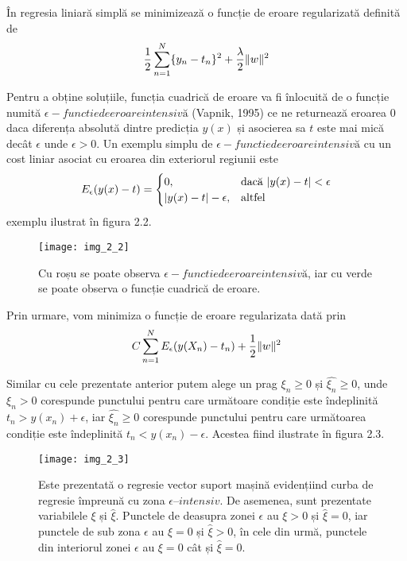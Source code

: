 În regresia liniară simplă se minimizează o funcție de eroare regularizată definită de
\begin{align}
	\frac{1}{2}\sum_{n=1}^{N}\{y_n-t_n\}^2+\frac{\lambda}{2}\lVert w\rVert^2
\end{align}

Pentru a obține soluțiile, funcția cuadrică de eroare va fi înlocuită de o funcție numită $\epsilon - functie de eroare intensivă$ (Vapnik, 1995) ce ne returnează eroarea 0 daca diferența absolută dintre predicția $y(x)$ și asocierea sa $t$ este mai mică decât $\epsilon$ unde $\epsilon > 0$. Un exemplu simplu de $\epsilon - functie de eroare intensivă$ cu un cost liniar asociat cu eroarea din exteriorul regiunii este
\begin{align}
	E_{\epsilon}(y(x) - t) = 
	\begin{cases}
	0,& \text{dacă } \lvert y(x) - t\rvert < \epsilon\\
	\lvert y(x) - t\rvert - \epsilon,              & \text{altfel}
	\end{cases}
\end{align}
exemplu ilustrat în figura 2.2.
\begin{figure}[!h]
	\centering
	\texttt{[image: img\_2\_2]}
	\caption[Vector suport mașină regresie]{Cu roșu se poate observa $\epsilon - functie de eroare intensivă$, iar cu verde se poate observa o funcție cuadrică de eroare.}
\end{figure}
 
Prin urmare, vom minimiza o funcție de eroare regularizata dată prin
\begin{align}	
	C\sum_{n = 1}^{N}E_{\epsilon}(y(X_n) - t_n) + \frac{1}{2}\lVert w\rVert ^ 2
\end{align}

Similar cu cele prezentate anterior putem alege un prag $\xi_n \geq 0$ și $ \widehat{\xi_n} \geq 0$, unde $\xi_n > 0$ corespunde punctului pentru care următoare condiție este îndeplinită $t_n > y(x_n) + \epsilon$, iar  $ \widehat{\xi_n} \geq 0$ corespunde punctului pentru care următoarea condiție este îndeplinită $t_n < y(x_n) - \epsilon$. Acestea fiind ilustrate în figura 2.3.
\begin{figure}[!h]
	\centering
	\texttt{[image: img\_2\_3]}
	\caption[Vector suport mașină regresie 2]{Este prezentată o regresie vector suport mașină evidențiind curba de regresie împreună cu zona $\epsilon – intensiv$. De asemenea, sunt prezentate variabilele $\xi$ și $ \widehat{\xi}$. Punctele de deasupra zonei $\epsilon$ au $\xi > 0$ și $ \widehat{\xi} = 0$, iar punctele de sub zona $\epsilon$ au $\xi = 0$ și $ \widehat{\xi} > 0$, în cele din urmă, punctele din interiorul zonei $\epsilon$ au $\xi = 0$ cât și $ \widehat{\xi} = 0$.}
\end{figure}

